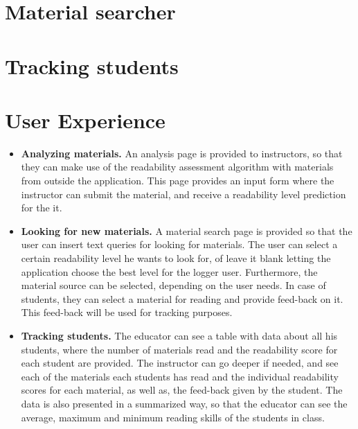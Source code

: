 \documentclass{sig-alternate-05-2015}
\begin{document}
%




\section{Material searcher}


\section{Tracking students}

\section{User Experience}

\begin{itemize}
\item \textbf{Analyzing materials.} An analysis page is provided to instructors, so that they can make use of the readability assessment algorithm \cite{imadrazo2016readability} with materials from outside the application. This page provides an input form where the instructor can submit the material, and receive a readability level prediction for the it.
\item \textbf{Looking for new materials.} A material search page is provided so that the user can insert text queries for looking for materials. The user can select a certain readability level he wants to look for, of leave it blank letting the application choose the best level for the logger user. Furthermore, the material source can be selected, depending on the user needs. In case of students, they can select a material for reading and provide feed-back on it. This feed-back will be used for tracking purposes.


\item \textbf{Tracking students.} The educator can see a table with data about all his students, where the number of materials read and the readability score for each student are provided. The instructor can go deeper if needed, and see each of the materials each students has read and the individual readability scores for each material, as well as, the feed-back given by the student. The data is also presented in a summarized way, so that the educator can see the average, maximum and minimum reading skills of the students in class.

\end{itemize}
\end{document}
